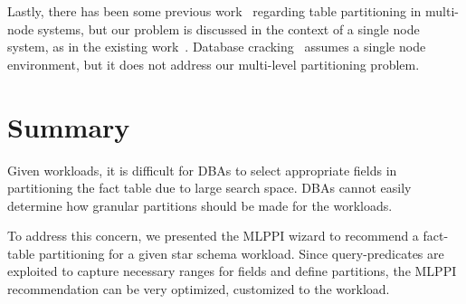 \documentclass[paper]{ieice}
\begin{document}

Lastly, there has been some previous work~\cite{nehme2011automated,rao2002automating,tatarowicz2012lookup} 
regarding table partitioning in multi-node \hbox{systems}, but 
our problem is discussed in the context of a single node system, as in the existing work~\cite{agrawal04:integrating}. 
Database cracking~\cite{idreoskm07}
assumes a single node environment, but 
it does not address our multi-level partitioning problem. 

\section{Summary}
\label{sec:conclusion}

Given workloads, it is difficult for DBAs to select appropriate fields 
in partitioning the fact table due to large search space. 
DBAs cannot easily determine how granular partitions should be made 
for the workloads. 

To address this concern, we presented the MLPPI wizard to recommend a fact-table partitioning for a given star schema workload. 
Since \hbox{query-predicates} are exploited 
to capture necessary ranges for fields and define partitions, 
the MLPPI \hbox{recommendation} can be very optimized, customized to the workload.  
\end{document}
